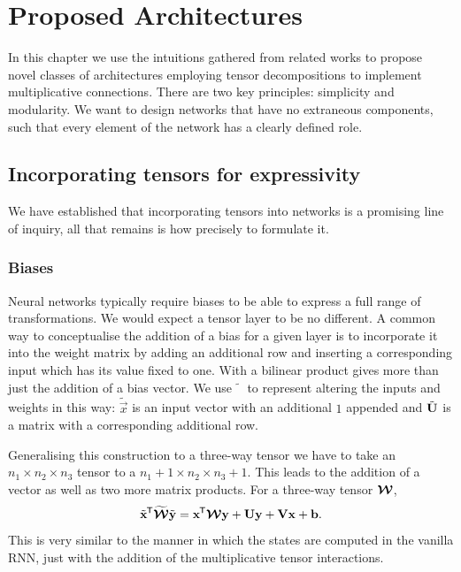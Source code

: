 
\chapter{Proposed Architectures}\label{C:arch}
In this chapter we use the intuitions gathered from related works to propose novel classes of
architectures employing tensor decompositions to implement multiplicative connections. There are
two key principles: simplicity and modularity. We want to design networks that have no extraneous
components, such that every element of the network has a clearly defined role.

\section{Incorporating tensors for expressivity}
We have established that incorporating tensors into networks is a promising line of inquiry, all that
remains is how precisely to formulate it.

\subsection{Biases}
Neural networks typically require biases to be able to express a full range of transformations. We would
expect a tensor layer to be no different. A common way to conceptualise the addition of a bias for a
given layer is to incorporate it into the weight matrix by adding an additional row and inserting a
corresponding input which has its value fixed to one. With a bilinear product gives more than
just the addition of a bias vector. We use \(\tilde{\phantom{x}}\) to represent altering the inputs
and weights in this way: \(\tilde{\vec{x}}\) is an input vector with an additional \(1\) appended
and \(\tilde{\mathbf{U}}\) is a matrix with a corresponding additional row.

Generalising this construction to a three-way tensor we have to take an \(n_1 \times n_2 \times n_3\)
tensor to a \(n_1 + 1 \times n_2 \times n_3 +1\). This leads to the addition of a vector as well as
two more matrix products. For a three-way tensor \(\bm{\mathcal{W}}\),
\begin{equation}\label{eq:tensorbias}
	\tilde{\mathbf{x}}^{\mkern-1.5mu\mathsf{T}}\widetilde{\bm{\mathcal{W}}}\tilde{\mathbf{y}}
	= \mathbf{x}^{\mkern-1.5mu\mathsf{T}}\bm{\mathcal{W}}\mathbf{y} + \mathbf{U}\mathbf{y} + \mathbf{V}\mathbf{x} + \mathbf{b}.
\end{equation} This is very similar to the manner in which the states are computed in the vanilla
RNN, just with the addition of the multiplicative tensor interactions.


